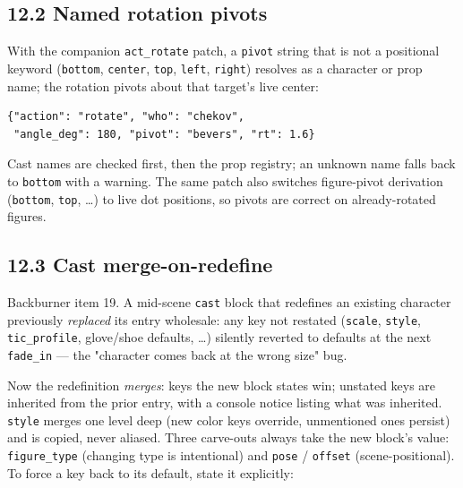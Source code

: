 \documentclass[
  12pt,
  letterpaper,
]{book}
\begin{document}
\subsection{\texorpdfstring{12.2 Named rotation
pivots}{12.2 Named rotation pivots}}\label{named-rotation-pivots}

With the companion \texttt{act\_rotate} patch, a \texttt{pivot}
string that is not a positional keyword (\texttt{bottom},
\texttt{center}, \texttt{top}, \texttt{left}, \texttt{right})
resolves as a character or prop name; the rotation pivots about that
target's live center:

\begin{verbatim}
{"action": "rotate", "who": "chekov",
 "angle_deg": 180, "pivot": "bevers", "rt": 1.6}
\end{verbatim}

Cast names are checked first, then the prop registry; an unknown name
falls back to \texttt{bottom} with a warning. The same patch also
switches figure-pivot derivation (\texttt{bottom}, \texttt{top},
\ldots) to live dot positions, so pivots are correct on
already-rotated figures.

\subsection{\texorpdfstring{12.3 Cast
merge-on-redefine}{12.3 Cast merge-on-redefine}}\label{cast-merge-on-redefine}

Backburner item 19. A mid-scene \texttt{cast} block that redefines an
existing character previously \emph{replaced} its entry wholesale:
any key not restated (\texttt{scale}, \texttt{style},
\texttt{tic\_profile}, glove/shoe defaults, \ldots) silently reverted
to defaults at the next \texttt{fade\_in} --- the "character comes
back at the wrong size" bug.

Now the redefinition \emph{merges}: keys the new block states win;
unstated keys are inherited from the prior entry, with a console
notice listing what was inherited. \texttt{style} merges one level
deep (new color keys override, unmentioned ones persist) and is
copied, never aliased. Three carve-outs always take the new block's
value: \texttt{figure\_type} (changing type is intentional) and
\texttt{pose} / \texttt{offset} (scene-positional). To force a key
back to its default, state it explicitly:
\end{document}

